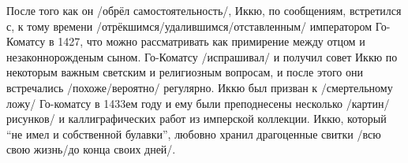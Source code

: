 \begin{ver}
После того как он /обрёл самостоятельность/, Иккю, по сообщениям,
встретился с, к тому времени /отрёкшимся/удалившимся/отставленным/
императором Го-Коматсу в 1427, что можно рассматривать как примирение
между отцом и незаконнорожденым сыном.
Го-Коматсу /испрашивал/ и получил совет Иккю по
некоторым важным светским и религиозным вопросам, и после этого они
встречались /похоже/вероятно/ регулярно.
Иккю был призван к /смертельному ложу/ Го-коматсу в 1433ем году и ему были
преподнесены несколько /картин/рисунков/ и каллиграфических работ из
имперской коллекции. Иккю, который ``не имел и собственной булавки'',
любовно хранил драгоценные свитки /всю свою жизнь/до конца своих дней/.
\end{ver}
